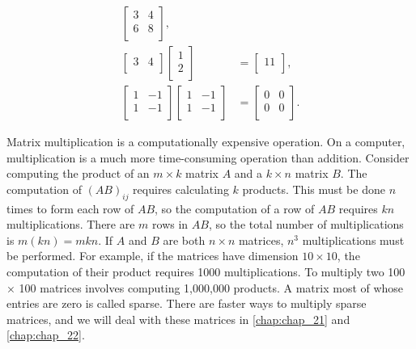\documentclass[../main.tex]{subfiles}
\begin{document}
\begin{example}
\begin{align}
\begin{bmatrix}
		3&4\\
		6&8\\
		\end{bmatrix}, \nonumber \\
		\begin{bmatrix}
		3 & 4\\
		\end{bmatrix}
		\begin{bmatrix}
		1\\2\\
		\end{bmatrix} &=
		\begin{bmatrix}
		11\\
		\end{bmatrix},	\nonumber \\
		\begin{bmatrix}
		1&-1\\
		1&-1\\
		\end{bmatrix}
		\begin{bmatrix}
		1&-1\\
		1&-1\\
		\end{bmatrix} &=
		\begin{bmatrix}
		0&0\\
		0&0\\
		\end{bmatrix}. \nonumber
	\end{align}
\end{example}

\begin{remark}
	Matrix multiplication is a computationally expensive operation. On a computer, multiplication is a much more time-consuming operation than addition. Consider computing the product of an $m \times  k$ matrix $A$ and a $k \times n$ matrix $B$. The computation of $(AB)_{ij}$ requires calculating $k$ products. This must be done $n$ times to form each row of $AB$, so the computation of a row of $AB$ requires $kn$ multiplications. There are $m$ rows in $AB$, so the total number of multiplications is $m (kn) = mkn$. If $A$ and $B$ are both $n \times n$ matrices, $n^{3}$ multiplications must be performed. For example, if the matrices have dimension $10 \times 10$, the computation of their product requires 1000 multiplications. To multiply two 100 × 100 matrices involves computing 1,000,000 products. A matrix most of whose entries are zero is called sparse. There are faster ways to multiply sparse matrices, and we will deal with these matrices in \autoref{chap:chap_21} and \ref{chap:chap_22}.
\end{remark}
\end{document}

